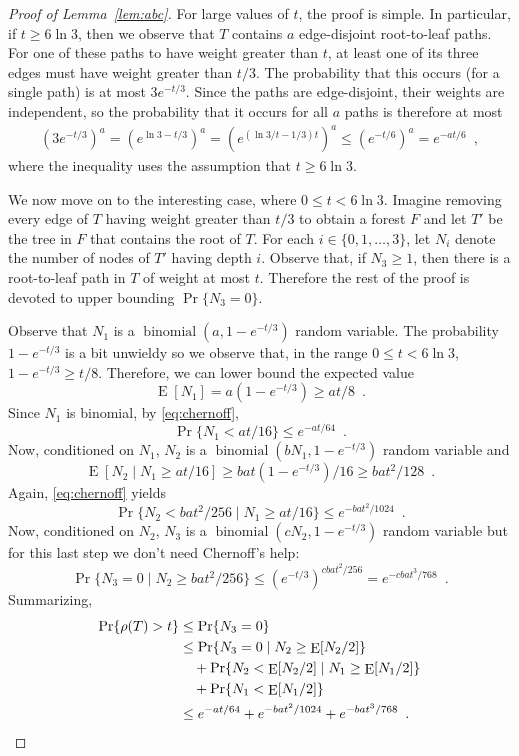 \documentclass[a4paper,UKenglish]{lipics-v2016}
\DeclareMathOperator{\E}{E}
\DeclareMathOperator{\binomial}{binomial}
\begin{document}
\begin{proof}[Proof of Lemma~\ref{lem:abc}]
  For large values of $t$, the proof is simple. In particular, if $t\ge 6\ln 3$,
  then we observe that $T$ contains $a$ edge-disjoint root-to-leaf paths.
  For one of these paths to have weight greater than $t$, at least one of
  its three edges must have weight greater than $t/3$.  The probability
  that this occurs (for a single path) is at most $3e^{-t/3}$. Since
  the paths are edge-disjoint, their weights are independent, so the
  probability that it occurs for all $a$ paths is therefore at most
  \begin{align*}
     (3e^{-t/3})^a = (e^{\ln 3-t/3})^a = (e^{(\ln 3/t-1/3)t})^a \le (e^{-t/6})^a = e^{-at/6}\enspace ,
  \end{align*}
  where the inequality uses the assumption that $t\ge 6\ln 3$.

  We now move on to the interesting case, where
  $0\le t < 6\ln 3$. 
  Imagine removing every edge of $T$ having weight greater than $t/3$
  to obtain a forest $F$ and let $T'$ be the tree in $F$ that contains
  the root of $T$.  For each $i\in\{0,1,\ldots,3\}$, let $N_i$ denote
  the number of nodes of $T'$ having depth $i$.
  Observe that, if $N_3\ge 1$, then there is a root-to-leaf path in $T$
  of weight at most $t$.  Therefore the rest of the proof is devoted to
  upper bounding $\Pr\{N_3=0\}$.

  Observe that $N_1$ is a $\binomial(a,1-e^{-t/3})$ random variable.
  The probability $1-e^{-t/3}$ is a bit unwieldy so we observe that,
  in the range $0\le t < 6\ln 3$, $1-e^{-t/3}\ge t/8$.  Therefore, we
  can lower bound the expected value
  \[
     \E[N_1] = a(1-e^{-t/3}) \ge at/8 \enspace .
  \]
  Since $N_1$ is binomial, 
  by \eqref{eq:chernoff},
  \[
     \Pr\{ N_1 < at/16 \} \le e^{-at/64} \enspace .
  \]
  Now, conditioned on $N_1$, $N_2$ is a $\binomial(bN_1, 1-e^{-t/3})$ random variable and
  \[
      \E[N_2\mid N_1\ge at/16] \ge bat(1-e^{-t/3})/16 \ge bat^2/128 \enspace .
  \]
  Again, \eqref{eq:chernoff} yields
  \[
      \Pr\{N_2 < bat^2/256\mid N_1 \ge at/16\} \le e^{-bat^2/1024} \enspace .
  \]
  Now, conditioned on $N_2$, $N_3$ is a $\binomial(cN_2,1-e^{-t/3})$
  random variable but for this last step we don't need Chernoff's help:
  \[
      \Pr\{N_3 = 0 \mid N_2\ge bat^2/256\} \le (e^{-t/3})^{cbat^2/256}
          = e^{-cbat^3/768} \enspace .
  \]
  Summarizing,
  \begin{align*}
     \Pr\{\rho(T) > t\} 
                    & \le \Pr\{N_3 = 0\} \\
                    & \le \Pr\{N_3 = 0\mid N_2 \ge \E[N_2/2]\} \\
                    &\quad{}+ \Pr\{N_2 < \E[N_2/2] \mid N_1 \ge \E[N_1/2]\} \\
                    &\quad{}+ \Pr\{N_1 < \E[N_1/2]\} \\
        & \le e^{-at/64} + e^{-bat^2/1024} + e^{-bat^3/768} \enspace .  \qedhere
  \end{align*}
\end{proof}
\end{document}
